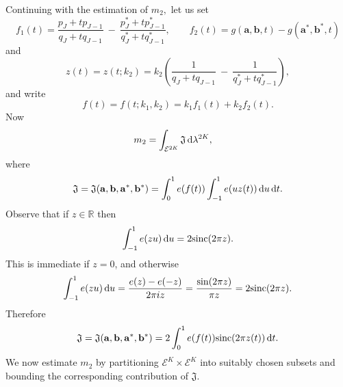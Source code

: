 \documentclass[12pt, reqno]{amsart}
\theoremstyle{definition}
\theoremstyle{remark}
\numberwithin{equation}{section}
\def\lam{{\lambda}} \def\Lam{{\Lambda}} \def\Lamtil{{\widetilde \Lambda}}
\def\d{{\,{\rm d}}}
\def \bR {\mathbb R}
\def \ba {\mathbf a}
\def \bb {\mathbf b}
\def \fJ {\mathfrak J}
\def \cE {\mathcal E}
\def \sinc {\mathrm{sinc}}
\begin{document}
Continuing with the estimation of $m_2,$ let us set
\begin{equation}\label{f1f2} f_1(t) = \frac{p_J + t p_{J-1}}{q_J + tq_{J-1}} \: - \: \frac{p_J^* + tp_{J-1}^*}{q_J^* + tq_{J-1}^*},
\qquad
f_2(t) = g(\ba,\bb, t) - g(\ba^*, \bb^*, t)
\end{equation}
and
\begin{equation} \label{def_z}
z(t) = z(t;k_2) = k_2 \left( \frac1{q_J + tq_{J-1}} \: - \: \frac1{q_J^* + t q_{J-1}^*} \right),
\end{equation}
and write
\begin{equation} \label{f_def}
f(t) = f(t; k_1, k_2) = k_1 f_1(t) + k_2 f_2(t).
\end{equation}
Now
\begin{align} \label{m2} 
m_2 &= \int_{\cE^{2K}} \fJ \d \lam^{2K},
\end{align}
where
\[
\fJ = \fJ(\ba, \bb, \ba^*, \bb^*) = \int_0^1 e(f(t)) \int_{-1}^1 e(u z(t)) \d u \d t.
\]
Observe that if $z \in \bR$ then
\[
\int_{-1}^1 e(zu) \d u = 2 \sinc(2 \pi z).
\]
This is immediate if $z = 0$, and otherwise
\[
\int_{-1}^1 e(zu) \d u  
= \frac{e(z) - e(-z)}{2 \pi i z} 
= \frac{\sin (2 \pi z)}{\pi z} 
= 2 \sinc(2\pi z).
\]
Therefore
\begin{equation} \label{fJ_first_presentation}
\fJ = \fJ(\ba, \bb, \ba^*, \bb^*) = 2 \int_0^1 e(f(t)) \sinc(2 \pi z(t)) \d t.
\end{equation}
We now estimate $m_2$ by partitioning $\cE^K\times \cE^K$ into suitably chosen subsets and bounding the corresponding contribution of $\fJ$. 
\end{document}
